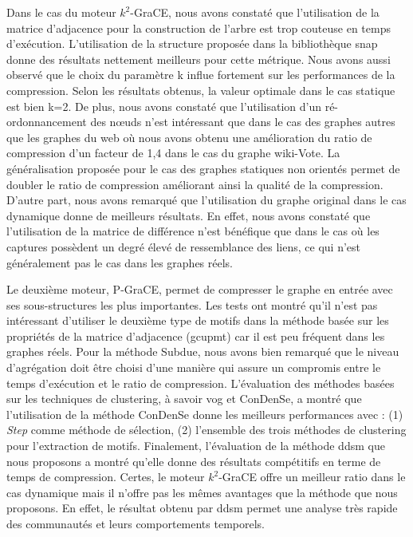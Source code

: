 	Dans le cas du moteur $k^2$-GraCE, nous avons constaté que l'utilisation de la matrice d'adjacence pour la construction de l'arbre est trop couteuse en temps d'exécution. L'utilisation de la structure proposée dans la bibliothèque \gls{snap} donne des résultats nettement meilleurs pour cette métrique. Nous avons aussi observé que le choix du paramètre k influe fortement sur les performances de la compression. Selon les résultats obtenus, la valeur optimale dans le cas statique est bien k=2. De plus, nous avons constaté que l'utilisation d'un ré-ordonnancement des nœuds n'est intéressant que dans le cas des graphes autres que les graphes du web où nous avons obtenu une amélioration du ratio de compression d'un facteur de 1,4 dans le cas du graphe wiki-Vote. La généralisation  proposée pour le cas des graphes statiques non orientés permet de doubler le ratio de compression améliorant ainsi la qualité de la compression. D'autre part, nous avons remarqué que l'utilisation du graphe original dans le cas dynamique donne de meilleurs résultats. En effet, nous avons constaté que l'utilisation de la matrice de différence n'est bénéfique que dans le cas où les captures possèdent un degré élevé de ressemblance des liens, ce qui n'est généralement pas le cas dans les graphes réels.
	
	Le deuxième moteur, P-GraCE, permet de compresser le graphe en entrée avec ses sous-structures les plus importantes. Les tests ont montré qu'il n'est pas intéressant d'utiliser le deuxième type de motifs dans la méthode  basée sur les propriétés de la matrice d'adjacence (\gls{gcupmt}) car il est peu fréquent dans les graphes réels. Pour la méthode Subdue, nous avons bien remarqué que le niveau d'agrégation doit être choisi d'une manière qui assure un compromis entre le temps d'exécution et le ratio de compression. L'évaluation des méthodes basées sur les techniques de clustering, à savoir \gls{vog} et \gls{ConDenSe}, a montré que l'utilisation de la méthode \gls{ConDenSe} donne les meilleurs performances avec : (1) \textit{Step} comme méthode de sélection, (2) l'ensemble des trois méthodes de clustering pour l'extraction de motifs. Finalement, l'évaluation de la méthode \gls{ddsm} que nous proposons a montré qu'elle donne des résultats compétitifs en terme de temps de compression. Certes, le moteur $k^2$-GraCE offre un meilleur ratio dans le cas dynamique mais il n'offre pas les mêmes avantages que la méthode que nous proposons. En effet, le résultat obtenu par \gls{ddsm} permet une analyse très rapide des communautés et leurs comportements temporels.
	
